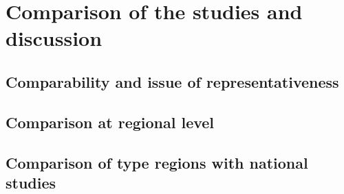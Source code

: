 \chapter{Comparison of the studies and discussion}

\section{Comparability and issue of representativeness}






\section{Comparison at regional level}






\section{Comparison of type regions with national studies}